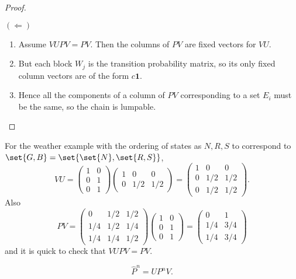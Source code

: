 \documentclass[12pt]{article}
\begin{document}
\begin{proof}
\begin{enumerate}
            \( (\Leftarrow) \)
            \begin{enumerate}
                \item
                    Assume \( VUPV = PV \).  Then the columns of \( PV \)
                    are fixed vectors for \( VU \).
                \item
                    But each block \( W_j \) is the transition
                    probability matrix, so its only fixed column vectors
                    are of the form \( c \mathbf{1} \).
                \item
                    Hence all the components of a column of \( PV \)
                    corresponding to a set \( E_i \) must be the same,
                    so the chain is lumpable.
            \end{enumerate}
    \end{enumerate}
\end{proof}

\begin{example}
    For the weather example with the ordering of states as \( N, R, S \)
    to correspond to \( \set{G,B} = \set{\set{N}, \set{R,S}} \),
    \[
        VU =
        \begin{pmatrix}
            1 & 0 \\
            0 & 1 \\
            0 & 1
        \end{pmatrix}
        \begin{pmatrix}
            1 & 0 & 0 \\
            0 & 1/2 & 1/2
        \end{pmatrix}
        =
        \begin{pmatrix}
            1 & 0 & 0 \\
            0 & 1/2 & 1/2 \\
            0 & 1/2 & 1/2
        \end{pmatrix}
        .
    \] Also
    \[
        PV =
        \begin{pmatrix}
            0 & 1/2 & 1/2 \\
            1/4 & 1/2 & 1/4 \\
            1/4 & 1/4 & 1/2
        \end{pmatrix}
        \begin{pmatrix}
            1 & 0 \\
            0 & 1 \\
            0 & 1
        \end{pmatrix}
        =
        \begin{pmatrix}
            0 & 1 \\
            1/4 & 3/4 \\
            1/4 & 3/4
        \end{pmatrix}
    \] and it is quick to check that \( VUPV = PV \).
\end{example}
\begin{corollary}
    \[
        \hat{P}^n = U P^n V.
    \]
\end{corollary}
\end{document}

